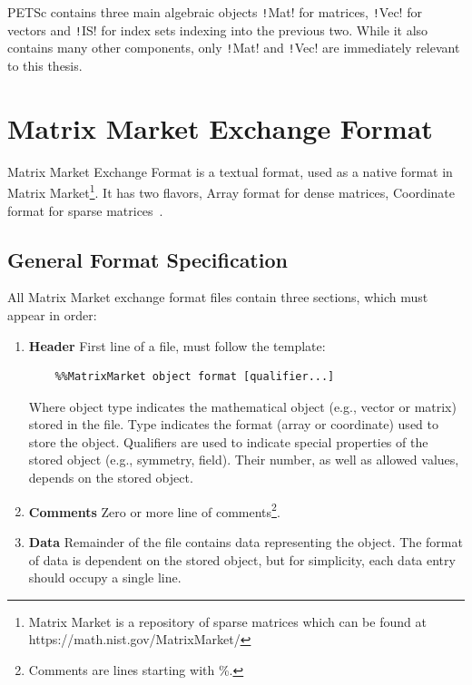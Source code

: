 \documentclass[thesis=M,english]{FITthesis}[2019/12/23]
\newcommand{\csre}[1]{\texttt!#1!}
\begin{document}
PETSc contains three main algebraic objects \csre{Mat} for matrices, \csre{Vec} for vectors and \csre{IS}
for index sets indexing into the previous two. While it also contains many other components, only \csre{Mat}
and \csre{Vec} are immediately relevant to this thesis.


\section{Matrix Market Exchange Format}\label{theory:MMEF}

Matrix Market Exchange Format is a textual format, used as a native format in Matrix Market\footnote{
    Matrix Market is a repository of sparse matrices which can be found at https://math.nist.gov/MatrixMarket/
}.
It has two flavors, Array format for dense matrices, Coordinate format for sparse matrices~\cite{mmef}.


\subsection{General Format Specification}

All Matrix Market exchange format files contain three sections, which must appear in order:

\begin{enumerate}
    \item \textbf{Header} First line of a file, must follow the template:
          \begin{lstlisting}
    %%MatrixMarket object format [qualifier...]
\end{lstlisting}
          Where object type indicates the mathematical object (e.g., vector or matrix)
          stored in the file. Type indicates the format (array or coordinate) used to store
          the object. Qualifiers are used to indicate special properties of the stored
          object (e.g., symmetry, field). Their number, as well as allowed values, depends on
          the stored object.
    \item \textbf{Comments} Zero or more line of comments\footnote{Comments are lines starting with \%.}.
    \item \textbf{Data} Remainder of the file contains data representing the object.
          The format of data is dependent on the stored object, but for simplicity,
          each data entry should occupy a single line.
\end{enumerate}
\end{document}
